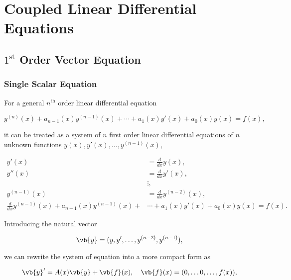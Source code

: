 \documentclass[english,a4paper,12pt]{report}
\begin{document}

\chapter{Coupled Linear Differential Equations}

\section{\(1^{\text{st} } \) Order Vector Equation}

\subsection{Single Scalar Equation}

For a general \(n^{\text{th}} \) order linear differential equation

\begin{equation}
    y^{(n)}(x) + a_{n-1}(x)y^{(n-1)}(x) + \cdots + a_1 (x)y'(x) + a_0 (x)y(x) = f(x),   
\end{equation}

it can be treated as a system of \(n\) first order linear differential equations of \(n\) unknown functions \(y(x),y'(x),\ldots ,y^{(n-1)}(x) \), 

\begin{equation}
    \begin{aligned}
        y'(x) &= \frac{d}{dx}y(x),\\
        y''(x) &= \frac{d}{dx}y'(x),\\
        &\vdots  ,\\
        y^{(n-1)}(x) &= \frac{d}{dx}y^{(n-2)}(x),\\   
        \frac{d}{dx}y^{(n-1)}(x) + a_{n-1}(x)y^{(n-1)}(x) + &\cdots + a_1 (x)y'(x) + a_0 (x)y(x) = f(x).
    \end{aligned}
\end{equation}

Introducing the natural vector 

\begin{equation}
    \vb{y} = (y,y',\ldots ,y^{(n-2)}, y^{(n-1)}),
\end{equation}

we can rewrite the system of equation into a more compact form as

\begin{equation}
    \vb{y} ' = A (x)\vb{y} + \vb{f} (x), \quad \vb{f} (x) = (0,\ldots 0,\ldots ,f(x)),   \label{inhomosys} 
\end{equation}
\end{document}
